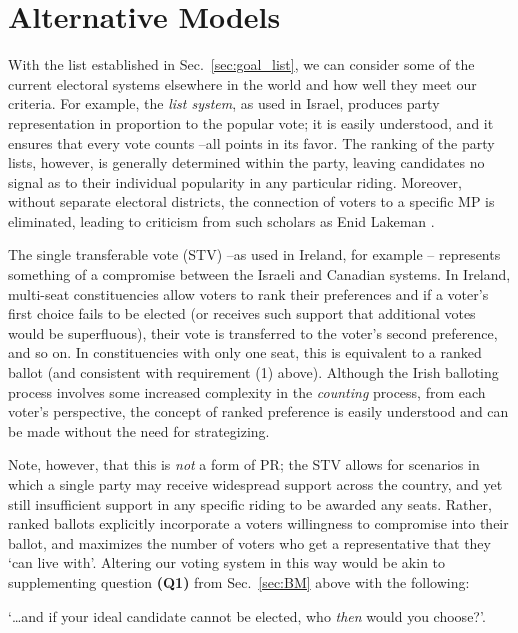 \documentclass[DIV=calc, paper=a4, fontsize=11pt, twocolumn]{scrartcl}	 %
\begin{document}
\section{Alternative Models}
\label{sec:alt_models}

With the list established in Sec.~\ref{sec:goal_list}, we can consider some of the current electoral systems elsewhere in the world and how well they meet our criteria. For example, the \emph{list system}, as used in Israel, produces party representation in proportion to the popular vote; it is easily understood, and it ensures that every vote counts \---all points in its favor. 
The ranking of the party lists, however, is generally determined within the party, leaving candidates no signal as to their individual popularity in any particular riding. Moreover, without separate electoral districts, the connection of voters to a specific MP is eliminated, leading to criticism from such scholars as Enid Lakeman\cite{Lakeman}
.

The single transferable vote (STV) \---as used in Ireland, for example\cite{Irish_howto_vote_doc}
\--- represents something of a compromise between the Israeli and Canadian systems. In Ireland, multi-seat constituencies allow voters to  rank their preferences and if a voter's first choice fails to be elected (or receives such support that additional votes would be superfluous), their vote is transferred to the voter's second preference, and so on. In constituencies with only one seat, this is equivalent to a ranked ballot (and consistent with requirement (1) above). 
Although the Irish balloting process involves some increased complexity in the \emph{counting} process, from each voter's perspective, the concept of ranked preference is easily understood and can be made without the need for strategizing.

Note, however, that this is \emph{not} a form of PR; the STV allows for scenarios in which a single party may receive widespread support across the country, and yet still insufficient support in any specific riding to be awarded any seats. Rather, ranked ballots explicitly incorporate a voters willingness to compromise into their ballot, and maximizes the number of voters who get a representative that they `can live with'.
Altering our voting system in this way would be akin to supplementing question \textbf{(Q1)} from Sec.~\ref{sec:BM} above with the following: 

\begin{tcolorbox}[colback=white!5!white,colframe=blue!55!black]
`\ldots and if your ideal candidate cannot be elected, who \emph{then} would you choose?'. 
\end{tcolorbox}
\end{document}
